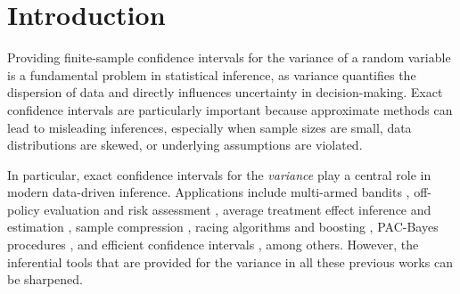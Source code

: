 
\section{Introduction} \label{section:introduction}


Providing finite-sample confidence intervals for the variance of a random variable is a fundamental problem in statistical inference, as variance quantifies the dispersion of data and directly influences uncertainty in decision-making. 
Exact confidence intervals are particularly important because approximate methods can lead to misleading inferences, especially when sample sizes are small, data distributions are skewed, or underlying assumptions are violated. 

In particular, exact confidence intervals for the \textit{variance} play a central role in modern data-driven inference. Applications include multi-armed bandits \citep{audibert2009exploration}, off-policy evaluation \citep{thomas2015high} and  risk assessment \citep{huang2022off}, average treatment effect inference \citep{howard2021time} and  estimation \citep{neopane2025optimistic}, sample compression \citep{maurer2009empirical}, racing algorithms and boosting \citep{mnih2008empirical}, PAC-Bayes procedures \citep{tolstikhin2013pac}, and efficient confidence intervals \citep{austern2022efficient}, among others. However, the inferential tools that are provided for the variance in all these previous works can be sharpened. 





  



